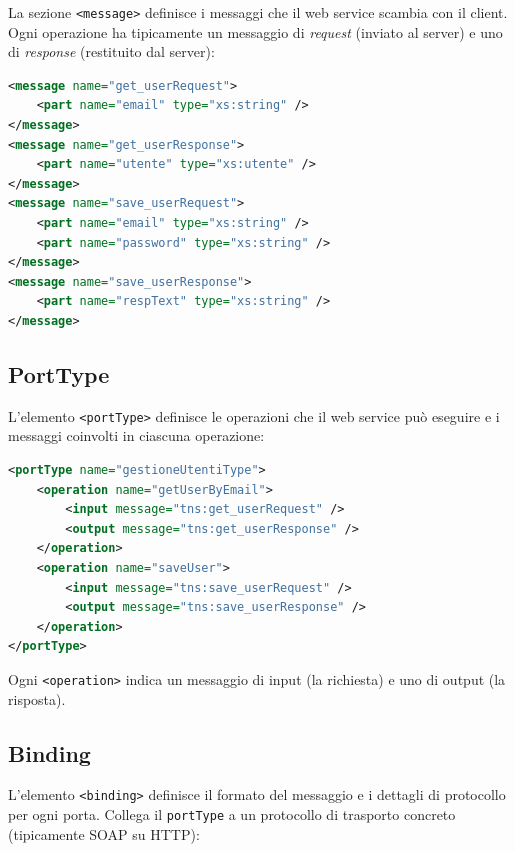 La sezione \texttt{<message>} definisce i messaggi che il web service scambia con il client. Ogni operazione ha tipicamente un messaggio di \emph{request} (inviato al server) e uno di \emph{response} (restituito dal server):

\begin{lstlisting}[language=XML]
<message name="get_userRequest">
    <part name="email" type="xs:string" />
</message>
<message name="get_userResponse">
    <part name="utente" type="xs:utente" />
</message>
<message name="save_userRequest">
    <part name="email" type="xs:string" />
    <part name="password" type="xs:string" />
</message>
<message name="save_userResponse">
    <part name="respText" type="xs:string" />
</message>
\end{lstlisting}

\subsection{PortType}

L'elemento \texttt{<portType>} definisce le operazioni che il web service può eseguire e i messaggi coinvolti in ciascuna operazione:

\begin{lstlisting}[language=XML]
<portType name="gestioneUtentiType">
    <operation name="getUserByEmail">
        <input message="tns:get_userRequest" />
        <output message="tns:get_userResponse" />
    </operation>
    <operation name="saveUser">
        <input message="tns:save_userRequest" />
        <output message="tns:save_userResponse" />
    </operation>
</portType>
\end{lstlisting}

Ogni \texttt{<operation>} indica un messaggio di input (la richiesta) e uno di output (la risposta).

\subsection{Binding}

L'elemento \texttt{<binding>} definisce il formato del messaggio e i dettagli di protocollo per ogni porta. Collega il \texttt{portType} a un protocollo di trasporto concreto (tipicamente SOAP su HTTP):

